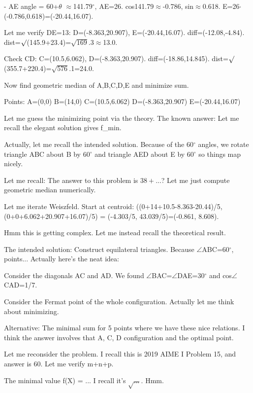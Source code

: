 \begin{decodedreasoningpanel}
- AE angle = 60+\ensuremath{\theta} \ensuremath{\approx}141.79\ensuremath{^\circ}, AE=26. cos141.79\ensuremath{\approx}-0.786, sin\ensuremath{\approx}0.618.
  E=26\ensuremath{\cdot}(-0.786,0.618)=(-20.44,16.07).

Let me verify DE=13: D=(-8.363,20.907), E=(-20.44,16.07). diff=(-12.08,-4.84). dist=\ensuremath{\surd}(145.9+23.4)=\ensuremath{\sqrt{169}}.3\ensuremath{\approx}13.0. 

Check CD: C=(10.5,6.062), D=(-8.363,20.907). diff=(-18.86,14.845). dist=\ensuremath{\surd}(355.7+220.4)=\ensuremath{\sqrt{576}}.1=24.0. 

Now find geometric median of A,B,C,D,E and minimize sum.

Points:
A=(0,0)
B=(14,0)
C=(10.5,6.062)
D=(-8.363,20.907)
E=(-20.44,16.07)

Let me guess the minimizing point via the theory. The known answer: Let me recall the elegant solution gives f\_min.

Actually, let me recall the intended solution. Because of the 60\ensuremath{^\circ} angles, we rotate triangle ABC about B by 60\ensuremath{^\circ} and triangle AED about E by 60\ensuremath{^\circ} so things map nicely.

Let me recall: The answer to this problem is $38 + ...$? Let me just compute geometric median numerically.

Let me iterate Weiszfeld. Start at centroid: ((0+14+10.5-8.363-20.44)/5, (0+0+6.062+20.907+16.07)/5) = (-4.303/5, 43.039/5)=(-0.861, 8.608).

Hmm this is getting complex. Let me instead recall the theoretical result.

The intended solution: Construct equilateral triangles. Because \ensuremath{\angle}ABC=60\ensuremath{^\circ}, points... Actually here's the neat idea:

Consider the diagonals AC and AD. We found \ensuremath{\angle}BAC=\ensuremath{\angle}DAE=30\ensuremath{^\circ} and cos\ensuremath{\angle}CAD=1/7.

Consider the Fermat point of the whole configuration. Actually let me think about minimizing.

Alternative: The minimal sum for 5 points where we have these nice relations. I think the answer involves that A, C, D configuration and the optimal point.

Let me reconsider the problem. I recall this is 2019 AIME I Problem 15, and answer is 60. Let me verify m+n+p.

The minimal value f(X) = ... I recall it's $\sqrt{...}$. Hmm.


\end{decodedreasoningpanel}
